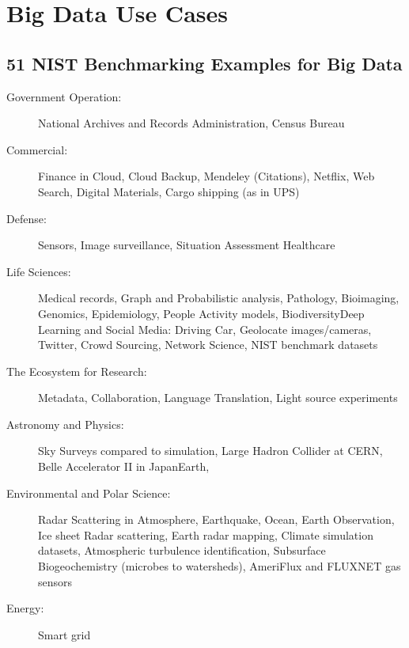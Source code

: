 \section{Big Data Use Cases}


\subsection{51 NIST Benchmarking Examples for Big Data}

\begin{description}

\item[Government Operation:] National Archives and Records
  Administration, Census Bureau

\item[Commercial:] Finance in Cloud, Cloud Backup, Mendeley
  (Citations), Netflix, Web Search, Digital Materials, Cargo shipping
  (as in UPS)

\item[Defense:] Sensors, Image surveillance, Situation Assessment
  Healthcare

\item[Life Sciences:] Medical records, Graph and Probabilistic
  analysis, Pathology, Bioimaging, Genomics, Epidemiology, People
  Activity models, BiodiversityDeep Learning and Social Media: Driving
  Car, Geolocate images/cameras, Twitter, Crowd Sourcing, Network
  Science, NIST benchmark datasets

\item[The Ecosystem for Research:] Metadata, Collaboration, Language
  Translation, Light source experiments

\item[Astronomy and Physics:] Sky Surveys compared to simulation,
  Large Hadron Collider at CERN, Belle Accelerator II in JapanEarth,

\item[Environmental and Polar Science:] Radar Scattering in
  Atmosphere, Earthquake, Ocean, Earth Observation, Ice sheet Radar
  scattering, Earth radar mapping, Climate simulation datasets,
  Atmospheric turbulence identification, Subsurface Biogeochemistry
  (microbes to watersheds), AmeriFlux and FLUXNET gas sensors

\item[Energy:] Smart grid

\end{description}



